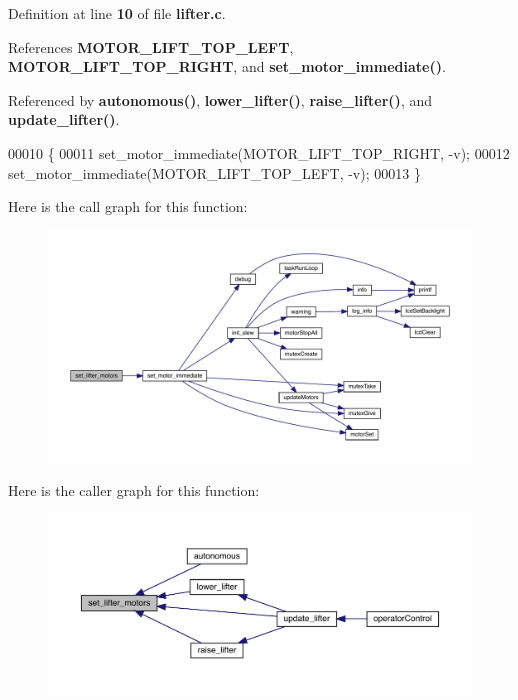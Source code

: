 Definition at line \textbf{ 10} of file \textbf{ lifter.\+c}.



References \textbf{ M\+O\+T\+O\+R\+\_\+\+L\+I\+F\+T\+\_\+\+T\+O\+P\+\_\+\+L\+E\+FT}, \textbf{ M\+O\+T\+O\+R\+\_\+\+L\+I\+F\+T\+\_\+\+T\+O\+P\+\_\+\+R\+I\+G\+HT}, and \textbf{ set\+\_\+motor\+\_\+immediate()}.



Referenced by \textbf{ autonomous()}, \textbf{ lower\+\_\+lifter()}, \textbf{ raise\+\_\+lifter()}, and \textbf{ update\+\_\+lifter()}.


\begin{DoxyCode}
00010                                     \{
00011   set_motor_immediate(MOTOR_LIFT_TOP_RIGHT, -v);
00012   set_motor_immediate(MOTOR_LIFT_TOP_LEFT, -v);
00013 \}
\end{DoxyCode}
Here is the call graph for this function\+:\nopagebreak
\begin{figure}[H]
\begin{center}
\leavevmode
\includegraphics[width=350pt]{lifter_8h_a16ed2ef406519bbd4d091f6321f4ed8a_cgraph}
\end{center}
\end{figure}
Here is the caller graph for this function\+:\nopagebreak
\begin{figure}[H]
\begin{center}
\leavevmode
\includegraphics[width=350pt]{lifter_8h_a16ed2ef406519bbd4d091f6321f4ed8a_icgraph}
\end{center}
\end{figure}
\mbox{\label{lifter_8h_abddc7cb502e12fa277b627c90a45efb1}} 

